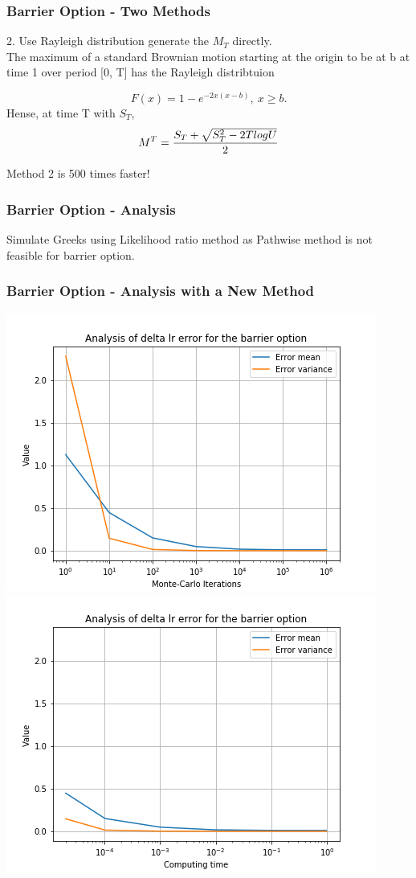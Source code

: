 \documentclass[12pt]{beamer}
\begin{document}
\begin{frame}
\frametitle{Barrier Option - Two Methods}

2. Use Rayleigh distribution generate the $M_T$ directly. \\
The maximum of a standard Brownian motion starting at the origin to be at b at time 1 over period [0, T] has the Rayleigh distribtuion

$$F(x) = 1 - e^{-2x(x-b)}, \ x \geq b.$$
Hense, at time T with $S_T$, 
$$M^T={S_T+\sqrt{S_T^2-2TlogU}\over 2}$$

Method 2 is 500 times faster!

\end{frame}

\begin{frame}
\frametitle{Barrier Option - Analysis}
Simulate Greeks using Likelihood ratio method as Pathwise method is not feasible for barrier option.


\end{frame}

\begin{frame}
\frametitle{Barrier Option - Analysis with a New Method}
\includegraphics[width=.5\textwidth]{graphs/barrierdeltalr.png}
\includegraphics[width=.5\textwidth]{graphs/barrierdeltalrtime.png}
\end{frame}
\end{document}
